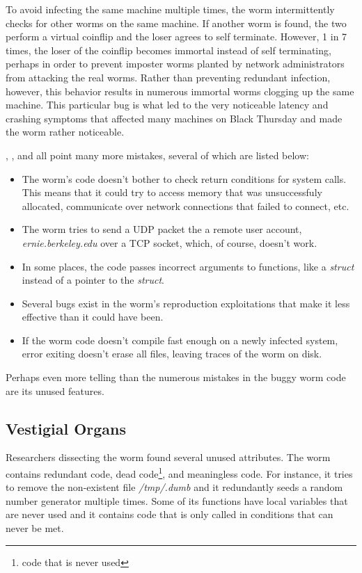 To avoid infecting the same machine multiple times, the worm 
intermittently checks for other worms on the same machine. If another worm is
found, the two perform a virtual coinflip and the loser agrees to self
terminate.
However, 1 in 7 times, the loser of the coinflip becomes immortal instead of
self terminating, perhaps in order to prevent imposter worms planted by network
administrators from attacking the real worms\cite{spafford_internet_1989}.
Rather than preventing redundant infection, however, this behavior results in
numerous immortal worms clogging up the same machine. This particular bug is
what led to the very noticeable latency and crashing symptoms that affected many
machines on Black Thursday and made the worm rather noticeable.

\cite{spafford_internet_1989}, \cite{seeley_tour_1989}, and \cite{eichin_microscope_1989}
all point many more mistakes, several of which are listed below: 
\begin{itemize}
\item The worm's code doesn't bother to check return conditions for system
calls. This means that it could try to access memory that was
unsuccessfuly allocated, communicate over network connections that failed to
connect, etc. 
\item The worm tries to send a UDP packet the a remote user account,
\textit{ernie.berkeley.edu} over a TCP socket, which, of course, doesn't work.
\item In some places, the code passes incorrect arguments to functions, like a
\textit{struct} instead of a pointer to the \textit{struct}.
\item Several bugs exist in the worm's reproduction exploitations that make it
less effective than it could have been. 
\item If the worm code doesn't compile fast enough on a newly infected system,
error exiting doesn't erase all files, leaving traces of the worm on
disk.
\end{itemize}

Perhaps even more telling than the numerous mistakes in the buggy worm code
are its unused features.


\subsection*{Vestigial Organs}

Researchers dissecting the worm found several
unused attributes. The worm contains redundant code, dead code\footnote{code
that is never used}, and meaningless code. For instance, it tries to remove the
non-existent file \textit{/tmp/.dumb} and it redundantly seeds a random number
generator multiple times. Some of its functions have local variables that are
never used and it contains code that is only called in conditions that can
never be met. 

